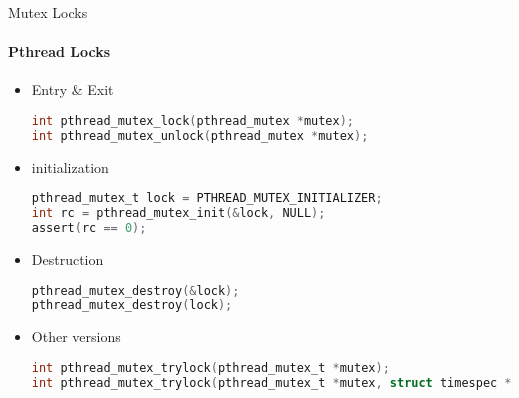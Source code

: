 \documentclass[10pt]{beamer}
\begin{document}
\begin{frame}[fragile]{Mutex Locks}
\framesubtitle{Pthread Locks}
\begin{itemize}
 
\item Entry \& Exit
\vspace{6pt}\\
\begin{lstlisting}[language=C]
int pthread_mutex_lock(pthread_mutex *mutex);
int pthread_mutex_unlock(pthread_mutex *mutex);
\end{lstlisting}
\item initialization
\vspace{6pt}\\
\begin{uncoverenv}
\begin{lstlisting}[language=C]
pthread_mutex_t lock = PTHREAD_MUTEX_INITIALIZER;
int rc = pthread_mutex_init(&lock, NULL);
assert(rc == 0);
\end{lstlisting}
\end{uncoverenv}
\item Destruction
\vspace{6pt}\\
\begin{uncoverenv}
\begin{lstlisting}[language=C]
pthread_mutex_destroy(&lock);
pthread_mutex_destroy(lock);
\end{lstlisting}
\end{uncoverenv}
\item Other versions
\vspace{6pt}\\
\begin{uncoverenv}
\begin{lstlisting}[language=C]
int pthread_mutex_trylock(pthread_mutex_t *mutex);
int pthread_mutex_trylock(pthread_mutex_t *mutex, struct timespec *abs_timeout);
\end{lstlisting}
\end{uncoverenv}
\end{itemize}
\end{frame}
\end{document}
